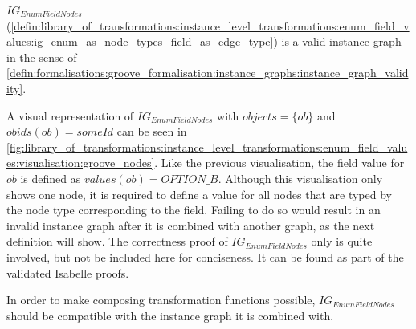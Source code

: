 \begin{thm}
\label{defin:library_of_transformations:instance_level_transformations:enum_field_values:ig_enum_as_node_types_field_as_edge_type_correct}
$IG_{EnumFieldNodes}$ (\cref{defin:library_of_transformations:instance_level_transformations:enum_field_values:ig_enum_as_node_types_field_as_edge_type}) is a valid instance graph in the sense of \cref{defin:formalisations:groove_formalisation:instance_graphs:instance_graph_validity}.
\end{thm}

A visual representation of $IG_{EnumFieldNodes}$ with $objects = \{ob\}$ and $obids(ob) = someId$ can be seen in \cref{fig:library_of_transformations:instance_level_transformations:enum_field_values:visualisation:groove_nodes}. Like the previous visualisation, the field value for $ob$ is defined as $values(ob) = OPTION\!\_B$. Although this visualisation only shows one node, it is required to define a value for all nodes that are typed by the node type corresponding to the field. Failing to do so would result in an invalid instance graph after it is combined with another graph, as the next definition will show. The correctness proof of $IG_{EnumFieldNodes}$ only is quite involved, but not be included here for conciseness. It can be found as part of the validated Isabelle proofs.

In order to make composing transformation functions possible, $IG_{EnumFieldNodes}$ should be compatible with the instance graph it is combined with.

